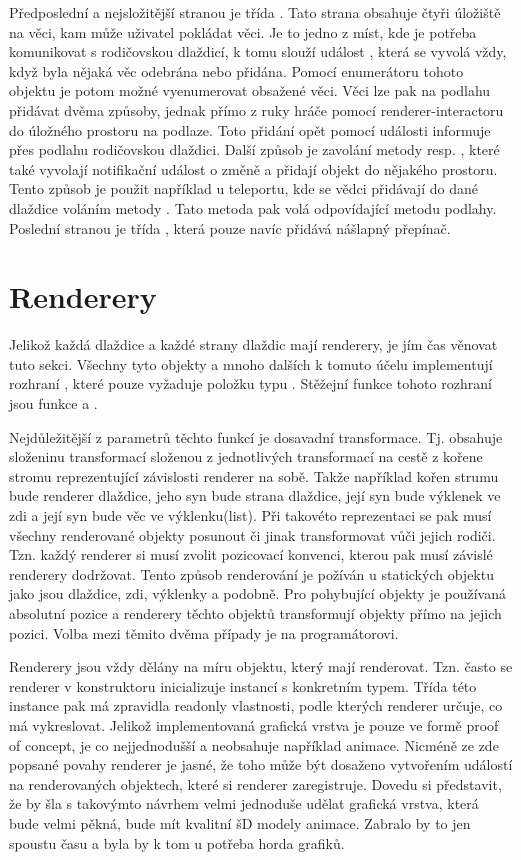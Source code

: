 Předposlední a nejsložitější stranou je třída  .  Tato strana obsahuje čtyři úložiště na věci,
kam může uživatel pokládat věci. Je to jedno z míst, kde je potřeba komunikovat s rodičovskou dlaždicí, k tomu
slouží událost , která se vyvolá vždy, když byla nějaká věc odebrána nebo přidána.
Pomocí enumerátoru tohoto objektu je potom možné vyenumerovat obsažené věci. Věci lze pak na podlahu přidávat dvěma 
způsoby, jednak přímo z ruky hráče pomocí renderer-interactoru do úložného prostoru na podlaze. Toto
přidání opět pomocí události informuje přes podlahu rodičovskou dlaždici. Další způsob je zavolání metody 
 resp. ,  které také vyvolají notifikační událost o změně a přidají objekt do nějakého prostoru.
Tento způsob je použit například u teleportu, kde se vědci přidávají do dané dlaždice voláním metody .
Tato metoda pak volá odpovídající metodu podlahy. Poslední stranou je  třída , která pouze navíc přidává 
nášlapný přepínač.

\section{Renderery}
Jelikož každá dlaždice a každé strany dlaždic mají renderery, je jím čas věnovat tuto sekci. Všechny tyto objekty
a mnoho dalších k tomuto účelu implementují rozhraní , které pouze vyžaduje  položku typu . 
Stěžejní funkce tohoto rozhraní jsou funkce  a . 

Nejdůležitější z parametrů těchto funkcí je dosavadní transformace. Tj. obsahuje složeninu transformací složenou z jednotlivých
transformací na cestě z kořene stromu reprezentující závislosti renderer na sobě. Takže například kořen strumu bude renderer
dlaždice, jeho syn bude strana dlaždice, její syn bude výklenek ve zdi a její syn bude věc ve
výklenku(list). Při takovéto reprezentaci se pak musí všechny renderované objekty posunout či jinak transformovat vůči jejich rodiči.
Tzn. každý renderer si musí zvolit pozicovací konvenci, kterou pak musí závislé renderery dodržovat. Tento způsob renderování je požíván u statických objektu jako
jsou dlaždice, zdi, výklenky a podobně. Pro pohybující objekty je používaná absolutní pozice a renderery
těchto objektů transformují objekty přímo na jejich pozici. Volba mezi těmito dvěma případy je na programátorovi.

Renderery jsou vždy dělány na míru objektu, který mají renderovat. Tzn. často se renderer v konstruktoru 
inicializuje instancí s konkretním typem. Třída této instance pak má zpravidla readonly vlastnosti,
podle kterých renderer určuje, co má vykreslovat. Jelikož implementovaná grafická vrstva je pouze ve formě proof of concept,
je co nejjednodušší a neobsahuje například animace. Nicméně ze zde popsané povahy renderer je jasné, že 
toho může být dosaženo vytvořením událostí na renderovaných objektech, které si renderer zaregistruje.
Dovedu si představit, že by šla s takovýmto návrhem velmi jednoduše udělat grafická vrstva, která bude
velmi pěkná, bude mít kvalitní šD modely animace. Zabralo by to jen spoustu času a byla by k tom u potřeba horda grafiků.

